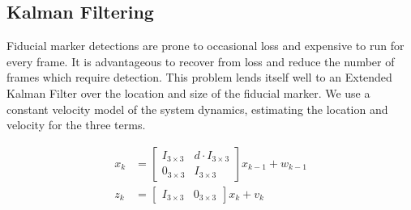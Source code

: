 \documentclass[letterpaper,10pt,conference]{IEEEtran}
\begin{document}
\subsection{Kalman Filtering}
Fiducial marker detections are prone to occasional loss and expensive to run for every frame.  It is advantageous to recover from loss and reduce the number of frames which require detection.  This problem lends itself well to an Extended Kalman Filter over the location and size of the fiducial marker.  We use a constant velocity model of the system dynamics, estimating the location and velocity for the three terms.

\begin{align}
x_k &= \left[ \begin{array}{cc}
I_{3\times 3} & d\cdot I_{3\times 3}\\
0_{3\times 3} & I_{3\times 3}
\end{array} \right] x_{k-1} + w_{k-1}\\
z_k &= \left[ \begin{array}{cc}
I_{3\times 3} & 0_{3\times 3}
\end{array} \right] x_k + v_k
\end{align}
\end{document}

